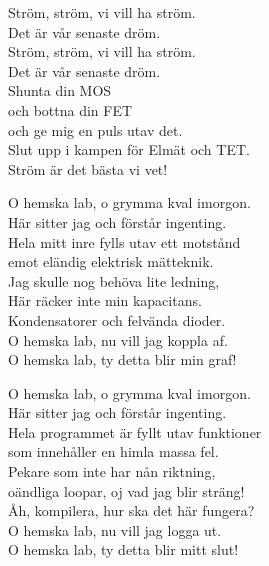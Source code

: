 \documentclass[a6paper, 10pt, twoside]{article}
\begin{document}
\noindent
\begin{center}
\end{center}
\begin{lyrics}
Ström, ström, vi vill ha ström. \\
Det är vår senaste dröm. \\
Ström, ström, vi vill ha ström. \\
Det är vår senaste dröm. 
\vspace{5pt} \\
Shunta din MOS \\
och bottna din FET \\
och ge mig en puls utav det. \\
Slut upp i kampen för Elmät och TET. \\
Ström är det bästa vi vet! 
\end{lyrics}
\vspace{20pt} 
\begin{center}
\end{center}
\begin{lyrics}
O hemska lab, o grymma kval imorgon. \\
Här sitter jag och förstår ingenting. \\
Hela mitt inre fylls utav ett motstånd \\
emot eländig elektrisk mätteknik. 
\vspace{5pt} \\
Jag skulle nog behöva lite ledning, \\
Här räcker inte min kapacitans. 
\vspace{5pt} \\
Kondensatorer och felvända dioder. \\
O hemska lab, nu vill jag koppla af. \\
O hemska lab, ty detta blir min graf! 
\end{lyrics}

\newpage
\noindent

\begin{center}
\end{center}
\begin{lyrics}
O hemska lab, o grymma kval imorgon. \\
Här sitter jag och förstår ingenting. \\
Hela programmet är fyllt utav funktioner\\
som innehåller en himla massa fel. 
\vspace{5pt} \\
Pekare som inte har nån riktning, \\
oändliga loopar, oj vad jag blir sträng!
\vspace{5pt} \\
Åh, kompilera, hur ska det här fungera? \\
O hemska lab, nu vill jag logga ut. \\
O hemska lab, ty detta blir mitt slut! 
\end{lyrics}
\end{document}
